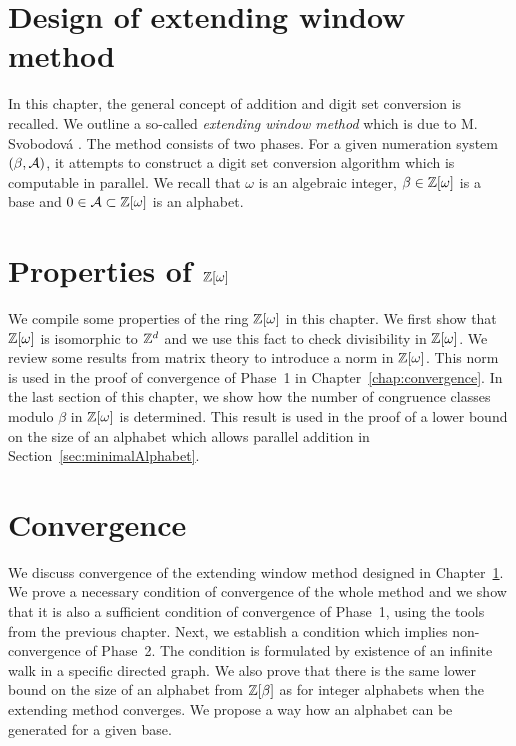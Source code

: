 \chapter{Design of extending window method}
\label{chap:ewm}
In this chapter, the general concept of addition and digit set conversion is recalled. We outline a so-called \emph{extending window method} which is due to M. Svobodov\'a \cite{milena}. The method consists of two phases. For a given numeration system $(\beta,\mathcal{A})$, it attempts to construct a digit set conversion algorithm which is computable in parallel. We recall that $\omega$ is an algebraic integer, $\beta \in \mathbb{Z}[\omega]$ is a base and $0\in\mathcal{A}\subset\mathbb{Z}[\omega]$ is an alphabet. 


	

\chapter{\texorpdfstring{Properties of $\mathbb{Z}[\omega]$}{Properties of Z[omega]}}
\label{chap:Zomega}
We compile some properties  of the ring $\mathbb{Z}[\omega]$ in this chapter. We first show that $\mathbb{Z}[\omega]$ is isomorphic to $\mathbb{Z}^d$ and we use this fact to check divisibility in $\mathbb{Z}[\omega]$.  We review some results from matrix theory to introduce a norm in $\mathbb{Z}[\omega]$. This norm is used in the proof of convergence of Phase~1 in Chapter~\ref{chap:convergence}. In the last section of this chapter, we show how the number of congruence classes modulo $\beta$ in $\mathbb{Z}[\omega]$ is determined. This result is used in the proof of a lower bound on the size of an alphabet which allows parallel addition in Section~\ref{sec:minimalAlphabet}.
	
	
		
	
\chapter{Convergence}
We discuss convergence of the extending window method designed in Chapter~\ref{chap:ewm}. We prove a necessary condition of convergence of the whole method and we show that it is also a sufficient condition of convergence of Phase~1, using the tools from the previous chapter. Next, we establish a condition which implies non-convergence of Phase~2. The condition is formulated by existence of an infinite walk in a specific directed graph. We also prove that there is the same lower bound on the size of an alphabet from $\mathbb{Z}[\beta]$ as for integer alphabets when the extending method converges. We propose a way how an alphabet can be generated for a given base.
\label{chap:convergence}


